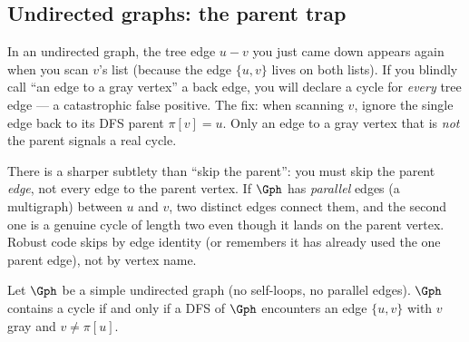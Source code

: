 \subsection{Undirected graphs: the parent trap}

\begin{trapbox}
In an undirected graph, the tree edge $u-v$ you just came down appears again when you scan $v$'s list (because the edge $\{u,v\}$ lives on both lists). If you blindly call ``an edge to a gray vertex'' a back edge, you will declare a cycle for \emph{every} tree edge --- a catastrophic false positive. The fix: when scanning $v$, ignore the single edge back to its DFS parent $\pi[v]=u$. Only an edge to a gray vertex that is \emph{not} the parent signals a real cycle.
\end{trapbox}

There is a sharper subtlety than ``skip the parent'': you must skip the parent \emph{edge}, not every edge to the parent vertex. If $\Gph$ has \emph{parallel} edges (a multigraph) between $u$ and $v$, two distinct edges connect them, and the second one is a genuine cycle of length two even though it lands on the parent vertex. Robust code skips by edge identity (or remembers it has already used the one parent edge), not by vertex name.

\begin{theorem}\label{ch03:thm-undircycle}
Let $\Gph$ be a simple undirected graph (no self-loops, no parallel edges). $\Gph$ contains a cycle if and only if a DFS of $\Gph$ encounters an edge $\{u,v\}$ with $v$ gray and $v\ne\pi[u]$.
\end{theorem}

